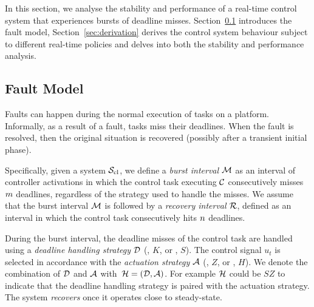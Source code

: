 In this section, we analyse the stability and performance of a real-time control system that experiences bursts of deadline misses. 
Section~\ref{sec:fault} introduces the fault model, Section~\ref{sec:derivation} derives the control system behaviour subject to different real-time policies and delves into both the stability and performance analysis.

\subsection{Fault Model}%
\label{sec:fault}

Faults can happen during the normal execution of tasks on a platform.
Informally, as a result of a fault, tasks miss their deadlines.
When the fault is resolved, then the original situation is recovered (possibly after a transient initial phase).

Specifically, given a system $\mathcal{S}_{\text{cl}}$, we define a \emph{burst interval} $\mathcal{M}$ as an interval of controller activations in which the control task executing $\mathcal{C}$ consecutively misses $m$ deadlines, regardless of the strategy used to handle the misses.
We assume that the burst interval $\mathcal{M}$ is followed by a \emph{recovery interval} $\mathcal{R}$, defined as an interval in which the control task consecutively hits $n$ deadlines.

During the burst interval, the deadline misses of the control task are handled using a \emph{deadline handling strategy} $\mathcal{D}$ (\tK{}, $K$, or \tS{}, $S$).
The control signal $u_t$ is selected in accordance with the \emph{actuation strategy} $\mathcal{A}$ (\tZ{}, $Z$, or \tH{}, $H$).
We denote the combination of $\mathcal{D}$ and $\mathcal{A}$ with~$\mathcal{H} = \left(\mathcal{D},\mathcal{A}\right)$.
For example $\mathcal{H}$ could be $SZ$ to indicate that the \tS{} deadline handling strategy is paired with the \tZ{} actuation strategy.
The system \emph{recovers} once it operates close to steady-state.


